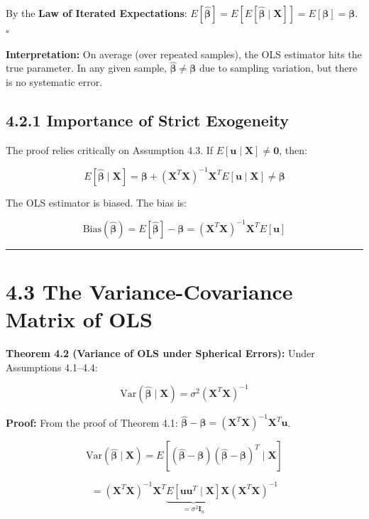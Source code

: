 By the \textbf{Law of Iterated Expectations}: $E[\hat{\boldsymbol{\beta}}] = E[E[\hat{\boldsymbol{\beta}} \mid \mathbf{X}]] = E[\boldsymbol{\beta}] = \boldsymbol{\beta}$. $\square$

\textbf{Interpretation:} On average (over repeated samples), the OLS estimator hits the true parameter. In any given sample, $\hat{\boldsymbol{\beta}} \neq \boldsymbol{\beta}$ due to sampling variation, but there is no systematic error.

\subsection{4.2.1 Importance of Strict Exogeneity}

The proof relies critically on Assumption 4.3. If $E[\mathbf{u} \mid \mathbf{X}] \neq \mathbf{0}$, then:

\[
E[\hat{\boldsymbol{\beta}} \mid \mathbf{X}] = \boldsymbol{\beta} + (\mathbf{X}^T\mathbf{X})^{-1}\mathbf{X}^T E[\mathbf{u} \mid \mathbf{X}] \neq \boldsymbol{\beta}
\]

The OLS estimator is biased. The bias is:

\[
\text{Bias}(\hat{\boldsymbol{\beta}}) = E[\hat{\boldsymbol{\beta}}] - \boldsymbol{\beta} = (\mathbf{X}^T\mathbf{X})^{-1}\mathbf{X}^T E[\mathbf{u}]
\]

\medskip\hrule\medskip

\section{4.3 The Variance-Covariance Matrix of OLS}

\textbf{Theorem 4.2 (Variance of OLS under Spherical Errors):} Under Assumptions 4.1--4.4:

\[
\text{Var}(\hat{\boldsymbol{\beta}} \mid \mathbf{X}) = \sigma^2 (\mathbf{X}^T\mathbf{X})^{-1}
\]

\textbf{Proof:} From the proof of Theorem 4.1: $\hat{\boldsymbol{\beta}} - \boldsymbol{\beta} = (\mathbf{X}^T\mathbf{X})^{-1}\mathbf{X}^T\mathbf{u}$.

\[
\text{Var}(\hat{\boldsymbol{\beta}} \mid \mathbf{X}) = E\left[(\hat{\boldsymbol{\beta}} - \boldsymbol{\beta})(\hat{\boldsymbol{\beta}} - \boldsymbol{\beta})^T \mid \mathbf{X}\right]
\]

\[
= (\mathbf{X}^T\mathbf{X})^{-1}\mathbf{X}^T \underbrace{E[\mathbf{u}\mathbf{u}^T \mid \mathbf{X}]}_{= \sigma^2 \mathbf{I}_n} \mathbf{X}(\mathbf{X}^T\mathbf{X})^{-1}
\]

